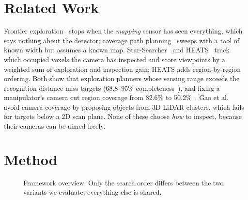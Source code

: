 \documentclass[conference,a4paper,10pt]{IEEEtran}
\begin{document}
\section{Related Work}
Frontier exploration~\cite{yamauchi} stops when the \emph{mapping} sensor has
seen everything, which says nothing about the detector; coverage path
planning~\cite{galceran} sweeps with a tool of known width but assumes a known
map. Star-Searcher~\cite{starsearcher} and HEATS~\cite{heats} track which
occupied voxels the camera has inspected and score viewpoints by a weighted sum
of exploration and inspection gain; HEATS adds region-by-region ordering. Both
show that exploration planners whose sensing range exceeds the recognition
distance miss targets (68.8--95\% completeness~\cite{starsearcher}), and fixing
a manipulator's camera cut region coverage from 82.6\% to 50.2\%~\cite{naazare}.
Gao et al.~\cite{gao} avoid camera coverage by proposing objects from 3D LiDAR
clusters, which fails for targets below a 2D scan plane. None of these choose
\emph{how} to inspect, because their cameras can be aimed freely.

\section{Method}

\begin{figure}[t]
\centering
{}
\caption{Framework overview. Only the search order differs between the two
variants we evaluate; everything else is shared.}
\label{fig:overview}
\end{figure}
\end{document}
